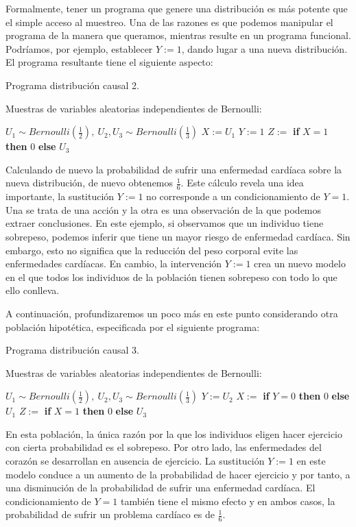 \documentclass[oneside,openright,titlepage,numbers=noenddot,openany,headinclude,footinclude=true,
cleardoublepage=empty,abstractoff,BCOR=5mm,paper=a4,fontsize=12pt,main=spanish]{scrreprt}
\begin{document}
Formalmente, tener un programa que genere una distribución es más potente que el simple acceso al muestreo. Una de las razones es que podemos manipular el programa de la manera que queramos, mientras resulte en un programa funcional. Podríamos, por ejemplo, establecer $Y := 1$, dando lugar a una nueva distribución. El programa resultante tiene el siguiente aspecto:

\begin{algorithm}[h]
\caption{Programa distribución causal 2.}
    Muestras de variables aleatorias independientes de Bernoulli:
    
    $U_1 \sim  Bernoulli\left(\frac{1}{2}\right), \ U_2,U_3 \sim  Bernoulli\left(\frac{1}{3}\right)$\;
    $X:=U_1$\;
    $Y:=1$\;
    $Z:=$ \textbf{if} $X=1$ \textbf{then} $0$ \textbf{else} $U_3$\;
\end{algorithm}

Calculando de nuevo la probabilidad de sufrir una enfermedad cardíaca sobre la nueva distribución, de nuevo obtenemos $\frac{1}{6}$. Este cálculo revela una idea importante, la sustitución $Y := 1$ no corresponde a un condicionamiento de $Y = 1$. Una se trata de una acción y la otra es una observación de la que podemos extraer conclusiones. En este ejemplo, si observamos que un individuo tiene sobrepeso, podemos inferir que tiene un mayor riesgo de enfermedad cardíaca. Sin embargo, esto no significa que la reducción del peso corporal evite las enfermedades cardíacas. En cambio, la intervención $Y := 1$ crea un nuevo modelo en el que todos los individuos de la población tienen sobrepeso con todo lo que ello conlleva.

A continuación, profundizaremos un poco más en este punto considerando otra población hipotética, especificada por el siguiente programa:

\begin{algorithm}[h]
\caption{Programa distribución causal 3.}
    Muestras de variables aleatorias independientes de Bernoulli:
     
    $U_1 \sim  Bernoulli\left(\frac{1}{2}\right), \ U_2,U_3 \sim  Bernoulli\left(\frac{1}{3}\right)$\;
    $Y:=U_2$\;
    $X:=$ \textbf{if} $Y=0$ \textbf{then} $0$ \textbf{else} $U_1$\;
    $Z:=$ \textbf{if} $X=1$ \textbf{then} $0$ \textbf{else} $U_3$\;
    \label{alg:programa3}
\end{algorithm}

En esta población, la única razón por la que los individuos eligen hacer ejercicio con cierta probabilidad es el sobrepeso. Por otro lado, las enfermedades del corazón se desarrollan en ausencia de ejercicio. La sustitución $Y := 1$ en este modelo conduce a un aumento de la probabilidad de hacer ejercicio y por tanto, a una disminución de la probabilidad de sufrir una enfermedad cardíaca. El condicionamiento de $Y = 1$ también tiene el mismo efecto y en ambos casos, la probabilidad de sufrir un problema cardíaco es de  $\frac{1}{6}$.
\end{document}
